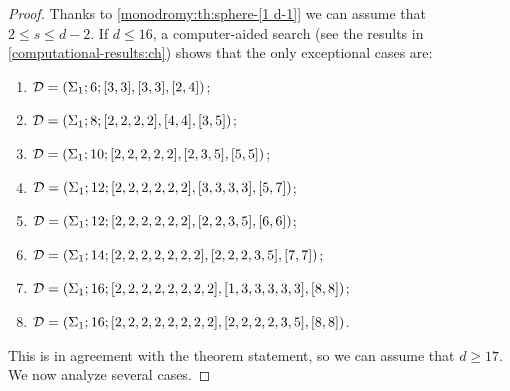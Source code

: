 \begin{proof}
Thanks to \cref{monodromy:th:sphere-[1 d-1]} we can assume that $2\le s\le d-2$. If $d\le 16$, a computer-aided search (see the results in \cref{computational-results:ch}) shows that the only exceptional cases are:
\begin{enumerate}[(1)]
\item $\mathcal{D}=(\Sigma_{1};6;[3, 3],[3, 3],[2, 4])$;
\item $\mathcal{D}=(\Sigma_{1};8;[2, 2, 2, 2],[4, 4],[3, 5])$;
\item $\mathcal{D}=(\Sigma_{1};10;[2, 2, 2, 2, 2],[2, 3, 5],[5, 5])$;
\item $\mathcal{D}=(\Sigma_{1};12;[2, 2, 2, 2, 2, 2],[3, 3, 3, 3],[5, 7])$;
\item $\mathcal{D}=(\Sigma_{1};12;[2, 2, 2, 2, 2, 2],[2, 2, 3, 5],[6, 6])$;
\item $\mathcal{D}=(\Sigma_{1};14;[2, 2, 2, 2, 2, 2, 2],[2, 2, 2, 3, 5],[7, 7])$;
\item $\mathcal{D}=(\Sigma_{1};16;[2, 2, 2, 2, 2, 2, 2, 2],[1, 3, 3, 3, 3, 3],[8, 8])$;
\item $\mathcal{D}=(\Sigma_{1};16;[2, 2, 2, 2, 2, 2, 2, 2],[2, 2, 2, 2, 3, 5],[8, 8])$.

\end{enumerate}
This is in agreement with the theorem statement, so we can assume that $d\ge 17$. We now analyze several cases.

\end{proof}
